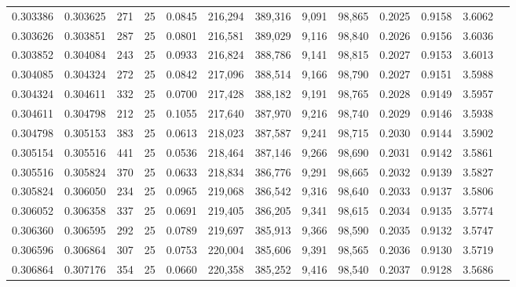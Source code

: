 \begin{tabular}{rrrrrrrrrrrrr}
0.303386 & 0.303625 &   271 &  25 &                                     0.0845 & 216,294 & 389,316 &   9,091 &  98,865 & 0.2025 & 0.9158 & 3.6062 \\
0.303626 & 0.303851 &   287 &  25 &                                     0.0801 & 216,581 & 389,029 &   9,116 &  98,840 & 0.2026 & 0.9156 & 3.6036 \\
0.303852 & 0.304084 &   243 &  25 &                                     0.0933 & 216,824 & 388,786 &   9,141 &  98,815 & 0.2027 & 0.9153 & 3.6013 \\
0.304085 & 0.304324 &   272 &  25 &                                     0.0842 & 217,096 & 388,514 &   9,166 &  98,790 & 0.2027 & 0.9151 & 3.5988 \\
0.304324 & 0.304611 &   332 &  25 &                                     0.0700 & 217,428 & 388,182 &   9,191 &  98,765 & 0.2028 & 0.9149 & 3.5957 \\
0.304611 & 0.304798 &   212 &  25 &                                     0.1055 & 217,640 & 387,970 &   9,216 &  98,740 & 0.2029 & 0.9146 & 3.5938 \\
0.304798 & 0.305153 &   383 &  25 &                                     0.0613 & 218,023 & 387,587 &   9,241 &  98,715 & 0.2030 & 0.9144 & 3.5902 \\
0.305154 & 0.305516 &   441 &  25 &                                     0.0536 & 218,464 & 387,146 &   9,266 &  98,690 & 0.2031 & 0.9142 & 3.5861 \\
0.305516 & 0.305824 &   370 &  25 &                                     0.0633 & 218,834 & 386,776 &   9,291 &  98,665 & 0.2032 & 0.9139 & 3.5827 \\
0.305824 & 0.306050 &   234 &  25 &                                     0.0965 & 219,068 & 386,542 &   9,316 &  98,640 & 0.2033 & 0.9137 & 3.5806 \\
0.306052 & 0.306358 &   337 &  25 &                                     0.0691 & 219,405 & 386,205 &   9,341 &  98,615 & 0.2034 & 0.9135 & 3.5774 \\
0.306360 & 0.306595 &   292 &  25 &                                     0.0789 & 219,697 & 385,913 &   9,366 &  98,590 & 0.2035 & 0.9132 & 3.5747 \\
0.306596 & 0.306864 &   307 &  25 &                                     0.0753 & 220,004 & 385,606 &   9,391 &  98,565 & 0.2036 & 0.9130 & 3.5719 \\
0.306864 & 0.307176 &   354 &  25 &                                     0.0660 & 220,358 & 385,252 &   9,416 &  98,540 & 0.2037 & 0.9128 & 3.5686 \\

\end{tabular}
